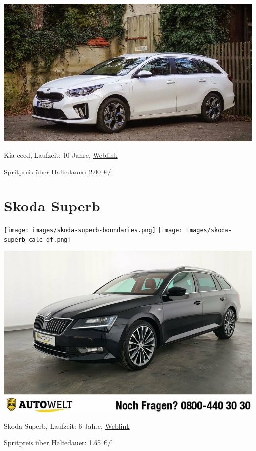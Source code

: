 \documentclass[landscape, DIV=99, 14pt]{scrartcl}
\begin{document}
\pagebreak
\null
\vspace{2cm}
\begin{center}
\includegraphics[width=0.9\columnwidth]{cars/kia-ceed-sportswagon.png}

Kia ceed, Laufzeit: 10 Jahre, \href{https://konfigurator.meinauto.de/kia/neuwagen/cee-d/angebote/cee-d-sporty-wagon/konfigurator/\#!/preisvergleich/platinum/8867329/3,7,18/private/109347-4167-291321/1321/61d21ce73c5db/cash-purchase/109348-8088-291322/48,0,10000,0,0,0,0,0,}{Weblink}

Spritpreis \"uber Haltedauer: 2.00 \euro{}/l

\end{center}

\pagebreak


\twocolumn

\section*{Skoda Superb}
\begin{center}
\texttt{[image: images/skoda-superb-boundaries.png]}
\null
\vspace{0.5cm}
\texttt{[image: images/skoda-superb-calc\_df.png]}
\end{center}

\pagebreak
\null
\vspace{2cm}
\begin{center}
\includegraphics[width=0.9\columnwidth]{cars/skoda-superb.png}

Skoda Superb, Laufzeit: 6 Jahre, \href{https://suchen.mobile.de/fahrzeuge/details.html?id=336967099}{Weblink}

Spritpreis \"uber Haltedauer: 1.65 \euro{}/l

\end{center}
\end{document}
